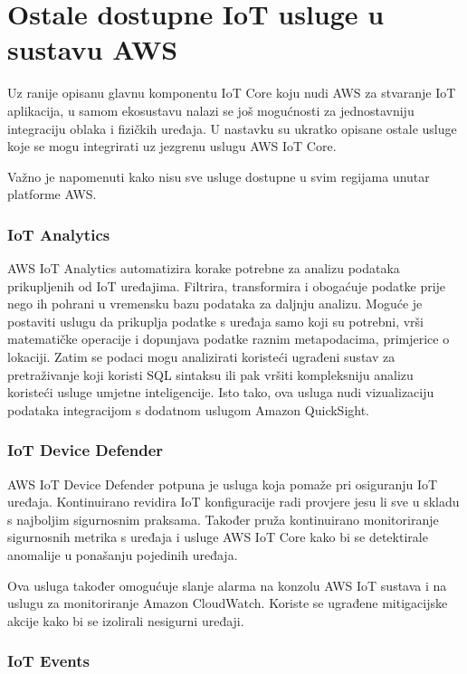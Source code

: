 \section{Ostale dostupne IoT usluge u sustavu AWS}

Uz ranije opisanu glavnu komponentu IoT Core koju nudi AWS za stvaranje IoT aplikacija, u samom ekosustavu nalazi se još mogućnosti za jednostavniju integraciju oblaka i fizičkih uređaja. U nastavku su ukratko opisane ostale usluge koje se mogu integrirati uz jezgrenu uslugu AWS IoT Core.

Važno je napomenuti kako nisu sve usluge dostupne u svim regijama unutar platforme AWS.

\subsubsection{IoT Analytics}

AWS IoT Analytics automatizira korake potrebne za analizu podataka prikupljenih od IoT uređajima. Filtrira, transformira i obogaćuje podatke prije nego ih pohrani u vremensku bazu podataka za daljnju analizu. Moguće je postaviti uslugu da prikuplja podatke s uređaja samo koji su potrebni, vrši matematičke operacije i dopunjava podatke raznim metapodacima, primjerice o lokaciji. Zatim se podaci mogu analizirati koristeći ugrađeni sustav za pretraživanje koji koristi SQL sintaksu ili pak vršiti kompleksniju analizu koristeći usluge umjetne inteligencije. Isto tako, ova usluga nudi vizualizaciju podataka integracijom s dodatnom uslugom Amazon QuickSight. 

\subsubsection{IoT Device Defender}

AWS IoT Device Defender potpuna je usluga koja pomaže pri osiguranju IoT uređaja. Kontinuirano revidira IoT konfiguracije radi provjere jesu li sve u skladu s najboljim sigurnosnim praksama. Također pruža kontinuirano monitoriranje sigurnosnih metrika s uređaja i usluge AWS IoT Core kako bi se detektirale anomalije u ponašanju pojedinih uređaja. 

Ova usluga također omogućuje slanje alarma na konzolu AWS IoT sustava i na uslugu za monitoriranje Amazon CloudWatch. Koriste se ugrađene mitigacijske akcije kako bi se izolirali nesigurni uređaji.

\subsubsection{IoT Events}

